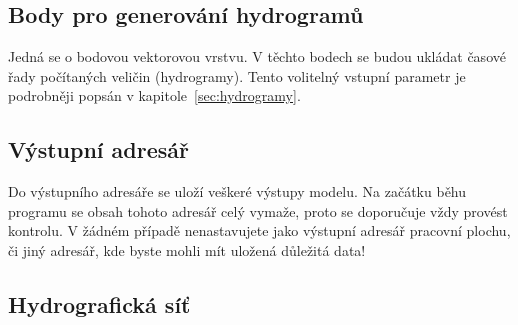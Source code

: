 \subsection{Body pro generování hydrogramů} \label{sec:vstupbody}

Jedná  se o bodovou vektorovou vrstvu. V těchto bodech se budou ukládat časové řady počítaných veličin (hydrogramy). Tento volitelný vstupní parametr je podrobněji popsán v kapitole~\ref{sec:hydrogramy}.











\subsection{Výstupní adresář} \label{sec:vstupadresar}
Do výstupního adresáře se uloží veškeré výstupy modelu. Na začátku běhu programu se obsah tohoto adresář celý vymaže, proto se doporučuje vždy provést kontrolu. V žádném případě nenastavujete jako výstupní adresář pracovní plochu, či jiný adresář, kde byste mohli mít uložená důležitá data!











% 
% 
% 
% 
% 







\subsection{Hydrografická síť} \label{sec:vodnitoky}

